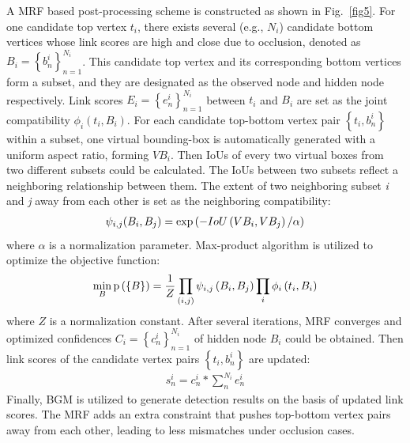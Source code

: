 \documentclass[runningheads]{llncs}
\begin{document}
A MRF based post-processing scheme is constructed as shown in Fig.~\ref{fig5}. For one candidate top vertex $t_{i}$, there exists several (e.g., $N_i$) candidate bottom vertices whose link scores are high and close due to occlusion, denoted as ${B_i} = \left\{ {b_n^i} \right\}_{n = 1}^{{N_i}}$. This candidate top vertex and its corresponding bottom vertices form a subset, and they are designated as the observed node and hidden node respectively. Link scores ${E_i} = \left\{ {e_n^i} \right\}_{n = 1}^{{N_i}}$ between $t_{i}$ and ${B_i}$ are set as the joint compatibility ${\phi _i}\left( {{t_i},{B_i}} \right)$. For each candidate top-bottom vertex pair $\left\{ {{t_i},b_n^i} \right\}$ within a subset, one virtual bounding-box is automatically generated with a uniform aspect ratio, forming $VB_{i}$. Then IoUs of every two virtual boxes from two different subsets could be calculated. The IoUs between two subsets reflect a neighboring relationship between them. The extent of two neighboring subset \textit{i} and \textit{j} away from each other is set as the neighboring compatibility: 
\begin{align}
{\psi _{i,j}({B_i},{B_j})} = {\rm{exp}}\left( { - IoU\left( {V{B_i},V{B_j}} \right)/\alpha } \right)
\end{align}
where $\alpha$ is a normalization parameter. Max-product algorithm is utilized to optimize the objective function:
\begin{align}
\mathop {\min }\limits_B {\rm{p}}\left( {\left\{ B \right\}} \right) = \frac{1}{Z}\mathop \prod \limits_{\left( {i,j} \right)} {\psi _{i,j}}\left( {{B_i},{B_j}} \right)\mathop \prod \limits_i {\phi _i}\left( {{t_i},{B_i}} \right)
\end{align}
where $Z$ is a normalization constant. After several iterations, MRF converges and optimized confidences ${C_i} = \left\{ {c_n^i} \right\}_{n = 1}^{{N_i}}$ of hidden node ${B_i}$ could be obtained. Then link scores of the candidate vertex pairs $\left\{ {{t_i},b_n^i} \right\}$ are updated: 
\begin{align}
s_n^i = c_n^i*\mathop \sum \nolimits_n^{{N_i}} e_n^i
\end{align}
Finally, BGM is utilized to generate detection results on the basis of updated link scores. The MRF adds an extra constraint that pushes top-bottom vertex pairs away from each other, leading to less mismatches under occlusion cases.
\end{document}
